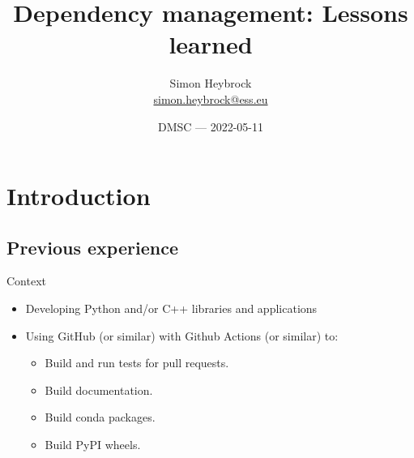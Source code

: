 \documentclass[english,aspectratio=169,smaller]{beamer}
\begin{document}
\title{Dependency management: Lessons learned}
\author[Simon Heybrock]{Simon Heybrock \\{\footnotesize\url{simon.heybrock@ess.eu}}\\\vspace{2mm}
}

\date{\scriptsize DMSC --- 2022-05-11}


\begin{frame}[plain]
    \titlepage
\end{frame}




\section{Introduction}
\subsection{Previous experience}

\begin{frame}{Context}
  \begin{itemize}
    \item Developing Python and/or C++ libraries and applications
    \item Using GitHub (or similar) with Github Actions (or similar) to:
      \begin{itemize}
        \item Build and run tests for pull requests.
        \item Build documentation.
        \item Build conda packages.
        \item Build PyPI wheels.
      \end{itemize}
  \end{itemize}
\end{frame}
\end{document}
